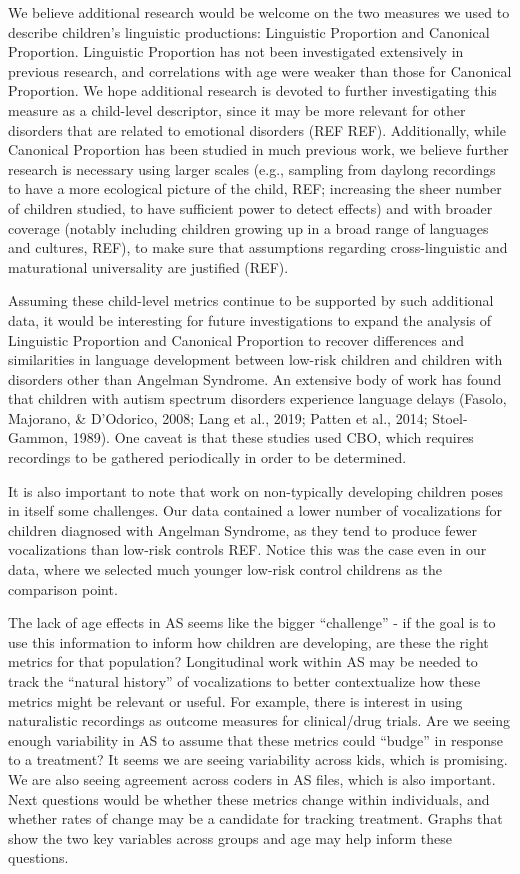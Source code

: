 \documentclass[english,,man,floatsintext]{apa6}
\begin{document}
We believe additional research would be welcome on the two measures we used to describe children's linguistic productions: Linguistic Proportion and Canonical Proportion. Linguistic Proportion has not been investigated extensively in previous research, and correlations with age were weaker than those for Canonical Proportion. We hope additional research is devoted to further investigating this measure as a child-level descriptor, since it may be more relevant for other disorders that are related to emotional disorders (REF REF). Additionally, while Canonical Proportion has been studied in much previous work, we believe further research is necessary using larger scales (e.g., sampling from daylong recordings to have a more ecological picture of the child, REF; increasing the sheer number of children studied, to have sufficient power to detect effects) and with broader coverage (notably including children growing up in a broad range of languages and cultures, REF), to make sure that assumptions regarding cross-linguistic and maturational universality are justified (REF).

Assuming these child-level metrics continue to be supported by such additional data, it would be interesting for future investigations to expand the analysis of Linguistic Proportion and Canonical Proportion to recover differences and similarities in language development between low-risk children and children with disorders other than Angelman Syndrome. An extensive body of work has found that children with autism spectrum disorders experience language delays (Fasolo, Majorano, \& D'Odorico, 2008; Lang et al., 2019; Patten et al., 2014; Stoel-Gammon, 1989). One caveat is that these studies used CBO, which requires recordings to be gathered periodically in order to be determined.

It is also important to note that work on non-typically developing children poses in itself some challenges. Our data contained a lower number of vocalizations for children diagnosed with Angelman Syndrome, as they tend to produce fewer vocalizations than low-risk controls REF. Notice this was the case even in our data, where we selected much younger low-risk control childrens as the comparison point.

The lack of age effects in AS seems like the bigger \enquote{challenge} - if the goal is to use this information to inform how children are developing, are these the right metrics for that population? Longitudinal work within AS may be needed to track the \enquote{natural history} of vocalizations to better contextualize how these metrics might be relevant or useful. For example, there is interest in using naturalistic recordings as outcome measures for clinical/drug trials. Are we seeing enough variability in AS to assume that these metrics could \enquote{budge} in response to a treatment? It seems we are seeing variability across kids, which is promising. We are also seeing agreement across coders in AS files, which is also important. Next questions would be whether these metrics change within individuals, and whether rates of change may be a candidate for tracking treatment. Graphs that show the two key variables across groups and age may help inform these questions.
\end{document}
